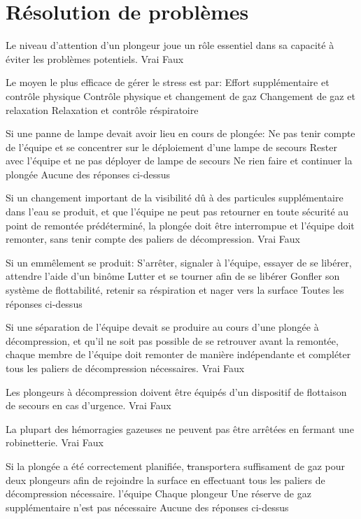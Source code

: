 \documentclass[english,10pt,a4paper,twoside]{article}
\begin{document}
	\section{Résolution de problèmes}
	\begin{outline}
		\1 Le niveau d'attention d'un plongeur joue un rôle essentiel dans sa capacité à éviter les problèmes potentiels.
			\2 Vrai
			\2 Faux

		\1 Le moyen le plus efficace de gérer le stress est par:
			\2 Effort supplémentaire et contrôle physique
			\2 Contrôle physique et changement de gaz
			\2 Changement de gaz et relaxation
			\2 Relaxation et contrôle réspiratoire

		\1 Si une panne de lampe devait avoir lieu en cours de plongée:
			\2 Ne pas tenir compte de l'équipe et se concentrer sur le déploiement d'une lampe de secours
			\2 Rester avec l'équipe et ne pas déployer de lampe de secours
			\2 Ne rien faire et continuer la plongée
			\2 Aucune des réponses ci-dessus

		\1 Si un changement important de la visibilité dû à des particules supplémentaire dans l'eau se produit, et que l'équipe ne peut pas retourner en toute sécurité au point de remontée prédéterminé, la plongée doit être interrompue et l'équipe doit remonter, sans tenir compte des paliers de décompression.
			\2 Vrai
			\2 Faux

		\1 Si un emmêlement se produit:
			\2 S'arrêter, signaler à l'équipe, essayer de se libérer, attendre l'aide d'un binôme
			\2 Lutter et se tourner afin de se libérer
			\2 Gonfler son système de flottabilité, retenir sa réspiration et nager vers la surface
			\2 Toutes les réponses ci-dessus

		\1 Si une séparation de l'équipe devait se produire au cours d'une plongée à décompression, et qu'il ne soit pas possible de se retrouver avant la remontée, chaque membre de l'équipe doit remonter de manière indépendante et compléter tous les paliers de décompression nécessaires.
			\2 Vrai
			\2 Faux

		\1 Les plongeurs à décompression doivent être équipés d'un dispositif de flottaison de secours en cas d'urgence. 
			\2 Vrai
			\2 Faux

		\1 La plupart des hémorragies gazeuses ne peuvent pas être arrêtées en fermant une robinetterie.
			\2 Vrai
			\2 Faux

		\1 Si la plongée a été correctement planifiée, \st transportera suffisament de gaz pour deux plongeurs afin de rejoindre la surface en effectuant tous les paliers de décompression nécessaire.
			\2 l'équipe
			\2 Chaque plongeur
			\2 Une réserve de gaz supplémentaire n'est pas nécessaire
			\2 Aucune des réponses ci-dessus


\end{outline}
\end{document}
